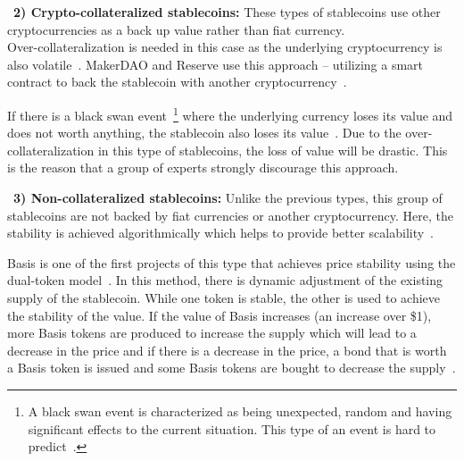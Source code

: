 ~\textbf{2) Crypto-collateralized stablecoins:} These types of stablecoins use other cryptocurrencies as a back up value rather than fiat currency. \\ Over-collateralization is needed in this case as the underlying cryptocurrency is also volatile~\cite{linkedin}. MakerDAO and Reserve use this approach -- utilizing a smart contract to back the stablecoin with another cryptocurrency~\cite{cointelegraph}.

If there is a black swan event~\footnote{A black swan event is characterized as being unexpected, random and having significant effects to the current situation. This type of an event is hard to predict~\cite{swan}.} where the underlying currency loses its value and does not worth anything, the stablecoin also loses its value~\cite{coinsexplained}.  Due to the over-collateralization in this type of stablecoins, the loss of value will be drastic. This is the reason that a group of experts strongly discourage this approach.

~\textbf{3) Non-collateralized stablecoins:} Unlike the previous types, this group of stablecoins are not backed by fiat currencies or another cryptocurrency. Here, the stability is achieved algorithmically which helps to provide better scalability~\cite{report}.

Basis is one of the first projects of this type that achieves price stability using the dual-token model~\cite{cryptoinsider}. In this method, there is dynamic adjustment of the existing supply of the stablecoin. While one token is stable, the other is used to achieve the stability of the value. If the value of Basis increases (an increase over \$1), more Basis tokens are produced to increase the supply which will lead to a decrease in the price and if there is a decrease in the price, a bond that is worth a Basis token is issued and some Basis tokens are bought to decrease the supply~\cite{euromoney}.



